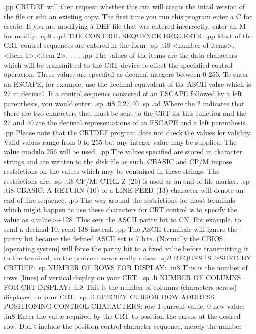 .pp
CRTDEF will then request whether this run will create the intial version
of the file or edit an existing copy.  The first time you run this
program enter a C for create.  If you are modifying a DEF file that was
entered incorrectly, enter an M for modify.
.cp8
.sp2
THE CONTROL SEQUENCE REQUESTS:
.pp
Most of the CRT control sequences are entered in the form:
.sp
.ti8
<number of items>,<item-1>,<item-2>, . . .
.pp
The values of the items are the data characters which will be transmitted
to the CRT device to effect the speciafied control operation.  These
values are specified as decimal integers between 0-255.  To enter an
ESCAPE, for example, use the decimal equivalent of the ASCII value which
is 27 in decimal.  If a control sequence consisted of an ESCAPE followed by
a left parenthesis, you would enter:
.sp
.ti8
2,27,40
.sp
.ad
Where the 2 indicates that there are two characters that must be sent to the
CRT for this function and the 27 and 40 are the decimal representations
of an ESCAPE and a left parenthesis.
.pp
Please note that the CRTDEF program does not check the values for validity.
Valid values range from 0 to 255 but any integer value may be supplied.  The
value modulo 256 will be used.
.pp
The values specified are stored in character strings and are written
to the disk file as such.  CBASIC and CP/M impose restrictions on the
values which may be contained in these strings.  The restrictions are:
.sp
.ti8
CP/M:  CTRL-Z (26) is used as an end-of-file marker.
.sp
.ti8
CBASIC:  A RETURN (10) or a LINE-FEED (13) character will denote an end of
line sequence.
.pp
The way around the restrictions for most terminals which might happen to use
these characters for CRT control is to specify the value as <value>+128.
This sets the ASCII parity bit to ON.  For example, to send a decimal
10, send 138 instead.
.pp
The ASCII terminals will ignore the parity bit because the defined
ASCII set is 7 bits.  (Normally the CBIOS [operating system] will force
the parity bit to a fixed value before transmitting it to the terminal,
so the problem never really arises.
.sp2
REQUESTS ISSUED BY CRTDEF:
.sp
NUMBER OF ROWS FOR DISPLAY:
.in8
This is the number of rows (lines) of vertical display on your CRT.
.sp
.li
NUMBER OF COLUMNS FOR CRT DISPLAY:
.in8
This is the number of columns (characters across) displayed on your CRT.
.sp
.li
SPECIFY CURSOR ROW ADDRESS POSITIONING CONTROL CHARACTERS:
	row 1  current value:  0
		   new value:
.in8
Enter the value required by the CRT to position the cursor at the desired row.
Don't include the position control character sequence, merely the number
